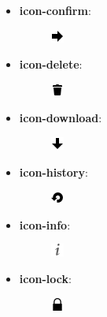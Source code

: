 \documentclass[letterpaper,10pt,english]{sphinxmanual}
\begin{document}
\begin{itemize}
\begin{description}
\end{description}

\item {} \begin{description}
\item[{\textbf{icon-confirm}:}] \leavevmode
\includegraphics{confirm.png}

\end{description}

\item {} \begin{description}
\item[{\textbf{icon-delete}:}] \leavevmode
\includegraphics{delete.png}

\end{description}

\item {} \begin{description}
\item[{\textbf{icon-download}:}] \leavevmode
\includegraphics{download.png}

\end{description}

\item {} \begin{description}
\item[{\textbf{icon-history}:}] \leavevmode
\includegraphics{history.png}

\end{description}

\item {} \begin{description}
\item[{\textbf{icon-info}:}] \leavevmode
\includegraphics{info.png}

\end{description}

\item {} \begin{description}
\item[{\textbf{icon-lock}:}] \leavevmode
\includegraphics{lock.png}


\end{description}
\end{itemize}
\end{document}
